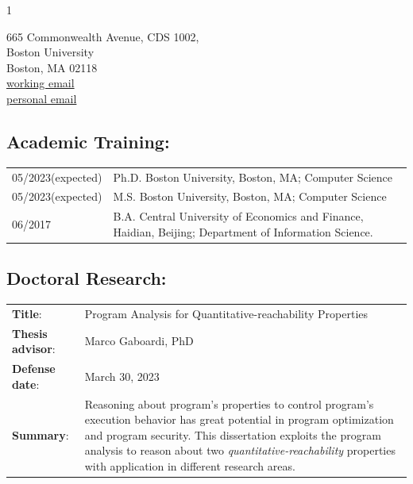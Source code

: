 \documentclass[12pt, letterpaper]{report}   %
\begin{document}
\setlength{\columnsep}{1.5in}
\begin{multicols}{1}{
\begin{center}{
665 Commonwealth Avenue, CDS 1002, \\ Boston University \\ Boston, MA 02118 \\
\hyperlink{mailto:jiawenl@bu.edu}{working email}\\
\hyperlink{mailto:jiawenliu18@gmail.com}{personal email}\\
}
\end{center}}
\end{multicols}

\subsection*{Academic Training:}
\begin{tabular}{p{}p{}}
05/2023\small(expected) &  Ph.D. Boston University, Boston, MA; Computer Science\\
05/2023\small(expected) &  M.S. Boston University, Boston, MA; Computer Science\\
06/2017  & B.A. Central University of Economics and Finance, Haidian, Beijing; Department of Information Science. \\
\end{tabular}

\subsection*{Doctoral Research:}
\begin{tabular}{p{}p{}}
\textbf{Title}: & Program Analysis for Quantitative-reachability Properties \\
\textbf{Thesis advisor}: & Marco Gaboardi, PhD\\
\textbf{Defense date}: & March 30, 2023 \\
\textbf{Summary}: & 
Reasoning about program's properties to control program's execution behavior
has great potential in 
program optimization and program security. 
This dissertation exploits the program analysis to reason about two \emph{quantitative-reachability} properties with application in different research areas.
\end{tabular}

\end{document}

